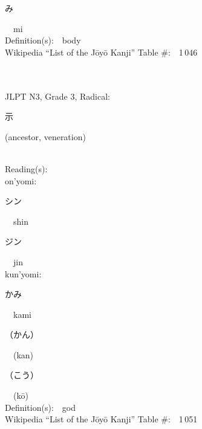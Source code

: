 \begin{multicols}{2}
{\hspace*{2em}}{\begin{CJK}{UTF8}{min} み \end{CJK}}\ \ mi\ \ \\
Definition(s):\ \ body \\
Wikipedia ``List of the J\=oy\=o Kanji'' Table \#:\ \ 1\,046 \\
\ \ \\
{\fontsize{34pt}{40pt}  }\ \ \\  %
{JLPT N3, Grade 3, Radical:\ \ {\begin{CJK}{UTF8}{min} 示 \end{CJK}} (ancestor, veneration) } \\
Reading(s):\ \ \\
{\hspace*{1em}}on'yomi:\ \ \\
{\hspace*{2em}}{\begin{CJK}{UTF8}{min} シン \end{CJK}}\ \ shin\ \ \\
{\hspace*{2em}}{\begin{CJK}{UTF8}{min} ジン \end{CJK}}\ \ jin\ \ \\
{\hspace*{1em}}kun'yomi:\ \ \\
{\hspace*{2em}}{\begin{CJK}{UTF8}{min} かみ \end{CJK}}\ \ kami\ \ \\
{\hspace*{2em}}{\begin{CJK}{UTF8}{min} （かん） \end{CJK}}\ \ (kan)\ \ \\
{\hspace*{2em}}{\begin{CJK}{UTF8}{min} （こう） \end{CJK}}\ \ (k\=o)\ \ \\
Definition(s):\ \ god \\
Wikipedia ``List of the J\=oy\=o Kanji'' Table \#:\ \ 1\,051 \\
\ \ \\
{\fontsize{34pt}{40pt}  }\ \ \\  %

\end{multicols}
